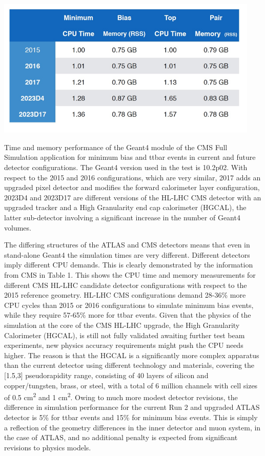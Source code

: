 \documentclass[12pt,a4paper]{article}
\begin{document}
{\begin{table}[bthp]
\vspace*{0.3cm}
\centering
\includegraphics[width=0.94\textwidth]{image15.png}
\caption{Time and memory performance of the Geant4 module of the
CMS Full Simulation application for minimum bias and ttbar events in
current and future detector configurations. The Geant4 version used in
the test is 10.2p02. With respect to the 2015 and 2016 configurations,
which are very similar, 2017 adds an upgraded pixel detector and
modifies the forward calorimeter layer configuration, 2023D4 and 2023D17
are different versions of the HL-LHC CMS detector with an upgraded
tracker and a High Granularity end cap calorimeter (HGCAL), the latter
sub-detector involving a significant increase in the number of Geant4
volumes. }
\label{label:table1}
\end{table}

The differing structures of the ATLAS and CMS detectors means that even
in stand-alone Geant4 the simulation times are very different. Different
detectors imply different CPU demands. This is clearly demonstrated by
the information from CMS in Table 1. This shows the CPU time and memory
measurements for different CMS HL-LHC candidate detector configurations
with respect to the 2015 reference geometry. HL-LHC CMS configurations
demand 28-36\% more CPU cycles than 2015 or 2016 configurations to
simulate minimum bias events, while they require 57-65\% more for ttbar
events. Given that the physics of the simulation at the core of the CMS
HL-LHC upgrade, the High Granularity Calorimeter (HGCAL), is still not
fully validated awaiting further test beam experiments, new physics
accuracy requirements might push the CPU needs higher. The reason is
that the HGCAL is a significantly more complex apparatus than the
current detector using different technology and materials, covering the
{[}1.5,3{]} pseudorapidity range, consisting of 40 layers of silicon and
copper/tungsten, brass, or steel, with a total of 6 million channels
with cell sizes of 0.5 cm\textsuperscript{2} and 1
cm\textsuperscript{2}. Owing to much more modest detector revisions, the
difference in simulation performance for the current Run 2 and upgraded
ATLAS detector is 5\% for ttbar events and 15\% for minimum bias events.
This is simply a reflection of the geometry differences in the inner
detector and muon system, in the case of ATLAS, and no additional
penalty is expected from significant revisions to physics models.

}
\end{document}
